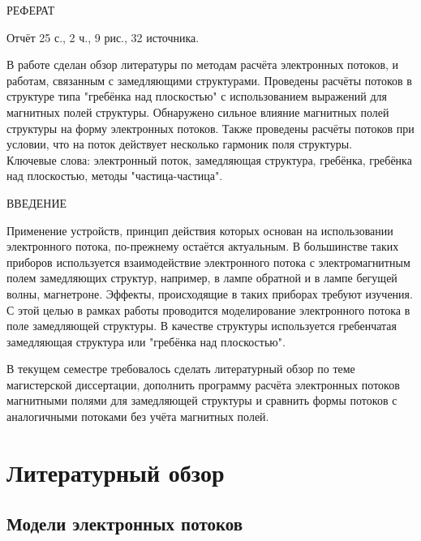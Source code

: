 \documentclass[a4paper,14pt]{extreport} %
\begin{document}
\setcounter{page}{2}

\begin{center}
	\MakeUppercase{Реферат}
\end{center}

Отчёт 25 с., 2 ч., 9 рис., 32 источника.

В работе сделан обзор литературы по методам расчёта электронных потоков, и работам, связанным с замедляющими структурами. Проведены расчёты потоков в структуре типа "гребёнка над плоскостью" с использованием выражений для магнитных полей структуры. Обнаружено сильное влияние магнитных полей структуры на форму электронных потоков. Также проведены расчёты потоков при условии, что на поток действует несколько гармоник поля структуры.
~\\

Ключевые слова: электронный поток, замедляющая структура, гребёнка, гребёнка над плоскостью, методы "частица-частица".

\newpage

\tableofcontents

\newpage


\begin{center}
	\MakeUppercase{Введение}
\end{center}

Применение устройств, принцип действия которых основан на использовании электронного потока, по-прежнему остаётся актуальным. В большинстве таких приборов используется взаимодействие электронного потока с электромагнитным полем замедляющих структур, например, в лампе обратной и в лампе бегущей волны, магнетроне. Эффекты, происходящие в таких приборах требуют изучения. С этой целью в рамках работы проводится моделирование электронного потока в поле замедляющей структуры. В качестве структуры используется гребенчатая замедляющая структура или "гребёнка над плоскостью".

В текущем семестре требовалось сделать литературный обзор по теме магистерской диссертации, дополнить программу расчёта электронных потоков магнитными полями для замедляющей структуры и сравнить формы потоков с аналогичными потоками без учёта магнитных полей.

\newpage

\chapter{Литературный обзор}
\section{Модели электронных потоков}
\end{document}
